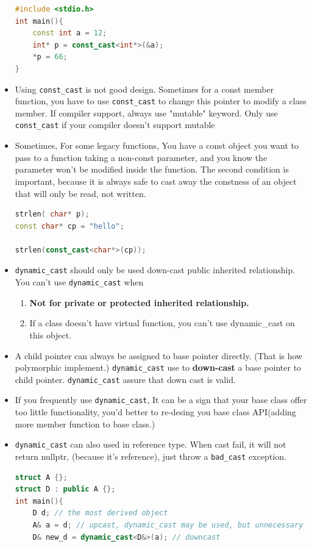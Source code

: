 \documentclass[a4paper,12pt,twoside]{book}
\begin{document}
\begin{itemize}
\begin{lstlisting}[frame=single, language=c++]
#include <stdio.h>
int main(){
    const int a = 12;
    int* p = const_cast<int*>(&a);
    *p = 66;
}
\end{lstlisting}

\item Using \texttt{const\_cast} is not good design. Sometimes for a const member function, you have to use \texttt{const\_cast} to change this pointer to modify a class member. If compiler support, always use "mutable"  keyword.  Only use \texttt{const\_cast} if your compiler doesn't support mutable

\item Sometimes, For some legacy functions, You have a const object you want to pass to a function taking a non-const parameter, and you know the parameter won't be modified inside the function. The second condition is important, because it is always safe to cast away the constness of an object that will only be read, not written.

\begin{lstlisting}[frame=single, language=c++, mathescape=true]
strlen( char* p);
const char* cp = "hello";

strlen(const_cast<char*>(cp));
\end{lstlisting}

\item \texttt{dynamic\_cast} should only be used down-cast public inherited relationship. You can't use \texttt{dynamic\_cast} when
\begin{enumerate}
	\item \textbf{Not for private or protected inherited relationship.}
	\item If a class doesn't have virtual function, you can't use dynamic\_cast on this object.
\end{enumerate}

\item A child pointer can always be assigned to base pointer directly. (That is how polymorphic implement.) \texttt{dynamic\_cast} use to \textbf{down-cast} a base pointer to child pointer. \texttt{dynamic\_cast} assure that down cast is valid. 

\item If you frequently use \texttt{dynamic\_cast}, It can be a sign that your base class offer too little functionality, you'd better to re-desing you base class API(adding more member function to base class.)

\item \texttt{dynamic\_cast} can also used in reference type. When cast fail, it will not return nullptr, (because it's reference), just throw a \texttt{bad\_cast} exception.
\begin{lstlisting}[frame=single, language=c++, mathescape=true]
struct A {};
struct D : public A {};
int main(){
    D d; // the most derived object
    A& a = d; // upcast, dynamic_cast may be used, but unnecessary
    D& new_d = dynamic_cast<D&>(a); // downcast
\end{lstlisting}



\end{itemize}
\end{document}

